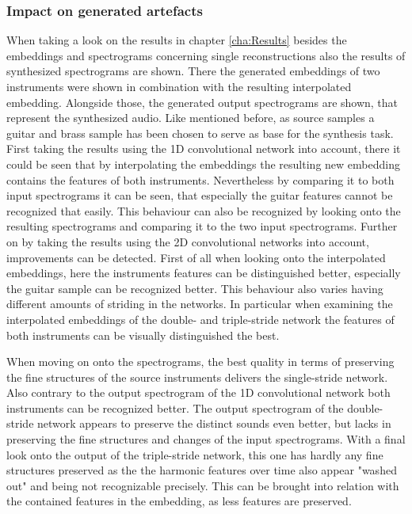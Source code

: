 \subsubsection{Impact on generated artefacts}
When taking a look on the results in chapter \ref{cha:Results} besides the embeddings and spectrograms concerning single reconstructions also the results of synthesized spectrograms are shown. There the generated embeddings of two instruments were shown in combination with the resulting interpolated embedding. Alongside those, the generated output spectrograms are shown, that represent the synthesized audio. Like mentioned before, as source samples a guitar and brass sample has been chosen to serve as base for the synthesis task. First taking the results using the 1D convolutional network into account, there it could be seen that by interpolating the embeddings the resulting new embedding contains the features of both instruments. Nevertheless by comparing it to both input spectrograms it can be seen, that especially the guitar features cannot be recognized that easily. This behaviour can also be recognized by looking onto the resulting spectrograms and comparing it to the two input spectrograms. Further on by taking the results using the 2D convolutional networks into account, improvements can be detected. First of all when looking onto the interpolated embeddings, here the instruments features can be distinguished better, especially the guitar sample can be recognized better. This behaviour also varies having different amounts of striding in the networks. In particular when examining the interpolated embeddings of the double- and triple-stride network the features of both instruments can be visually distinguished the best. 

When moving on onto the spectrograms, the best quality in terms of preserving the fine structures of the source instruments delivers the single-stride network. Also contrary to the output spectrogram of the 1D convolutional network both instruments can be recognized better. The output spectrogram of the double-stride network appears to preserve the distinct sounds even better, but lacks in preserving the fine structures and changes of the input spectrograms. With a final look onto the output of the triple-stride network, this one has hardly any fine structures preserved as the the harmonic features over time also appear "washed out" and being not recognizable precisely. This can be brought into relation with the contained features in the embedding, as less features are preserved.

